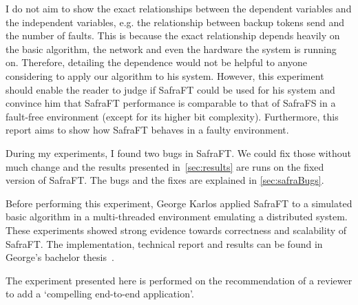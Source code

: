 I do not aim to show the exact relationships between the dependent variables and the independent variables, e.g. the relationship between backup tokens send and the number of faults.
This is because the exact relationship depends heavily on the basic algorithm, the network and even the hardware the system is running on.
Therefore, detailing the dependence would not be helpful to anyone considering to apply our algorithm to his system.
However, this experiment should enable the reader to judge if SafraFT could be used for his system and convince him that SafraFT performance is comparable to that of SafraFS in a fault-free environment (except for its higher bit complexity).
Furthermore, this report aims to show how SafraFT behaves in a faulty environment.

During my experiments, I found two bugs in SafraFT.
We could fix those without much change and the results presented in~\cref{sec:results} are runs on the fixed version of SafraFT.
The bugs and the fixes are explained in \cref{sec:safraBugs}.

Before performing this experiment, George Karlos applied SafraFT to a simulated basic algorithm in a multi-threaded environment emulating a distributed system.
These experiments showed strong evidence towards correctness and scalability of SafraFT.
The implementation, technical report and results can be found in George's bachelor thesis~\cite{karlos}.

The experiment presented here is performed on the recommendation of a reviewer to add a `compelling end-to-end application'.
